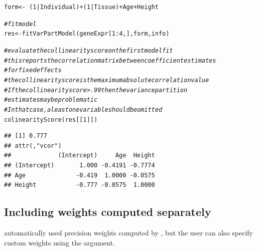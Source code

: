 \documentclass[12pt]{article}\usepackage[]{graphicx}\usepackage[]{xcolor}
\newcommand{\hlnum}[1]{\textcolor[rgb]{0.816,0.125,0.439}{#1}}%
\newcommand{\hlcom}[1]{\textcolor[rgb]{0.502,0.502,0.502}{\textit{#1}}}%
\newcommand{\hlopt}[1]{\textcolor[rgb]{0,0,0}{#1}}%
\newcommand{\hlstd}[1]{\textcolor[rgb]{0.251,0.251,0.251}{#1}}%
\newcommand{\hlkwb}[1]{\textcolor[rgb]{0,0,0}{#1}}%
\newcommand{\hlkwd}[1]{\textcolor[rgb]{0.878,0.439,0.125}{#1}}%
\newenvironment{knitrout}{}{} %
\begin{document}
\begin{knitrout}
\color{fgcolor}\begin{kframe}
\begin{alltt}
\hlstd{form} \hlkwb{<-} \hlopt{~} \hlstd{(}\hlnum{1} \hlopt{|} \hlstd{Individual)} \hlopt{+} \hlstd{(}\hlnum{1} \hlopt{|} \hlstd{Tissue)} \hlopt{+} \hlstd{Age} \hlopt{+} \hlstd{Height}

\hlcom{# fit model}
\hlstd{res} \hlkwb{<-} \hlkwd{fitVarPartModel}\hlstd{(geneExpr[}\hlnum{1}\hlopt{:}\hlnum{4}\hlstd{, ], form, info)}
\end{alltt}
\end{kframe}
\end{knitrout}
\begin{knitrout}
\color{fgcolor}\begin{kframe}
\begin{alltt}
\hlcom{# evaluate the collinearity score on the first model fit}
\hlcom{# this reports the correlation matrix between coefficient estimates}
\hlcom{# for fixed effects}
\hlcom{# the collinearity score is the maximum absolute correlation value}
\hlcom{# If the collinearity score > .99 then the variance partition}
\hlcom{# estimates may be problematic}
\hlcom{# In that case, a least one variable should be omitted}
\hlkwd{colinearityScore}\hlstd{(res[[}\hlnum{1}\hlstd{]])}
\end{alltt}
\begin{verbatim}
## [1] 0.777
## attr(,"vcor")
##             (Intercept)     Age  Height
## (Intercept)       1.000 -0.4191 -0.7774
## Age              -0.419  1.0000 -0.0575
## Height           -0.777 -0.0575  1.0000
\end{verbatim}
\end{kframe}
\end{knitrout}

\subsection{Including weights computed separately}

 automatically used precision weights computed by , but the user can also specify custom weights using the  argument.
\end{document}
